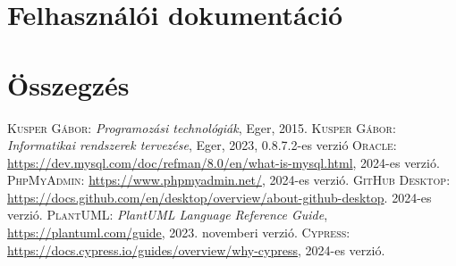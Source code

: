 \documentclass[]{thesis-ekf}
\theoremstyle{definition}
\theoremstyle{remark}
\begin{document}
	\chapter{Felhasználói dokumentáció}

	
	\chapter*{Összegzés}
	
	\begin{thebibliography}{2}
		\textsc{Kusper Gábor}: \emph{Programozási technológiák}, Eger, 2015.
		\textsc{Kusper Gábor}: \emph{Informatikai rendszerek tervezése}, Eger, 2023, 0.8.7.2-es verzió
		\textsc{Oracle}: \url{https://dev.mysql.com/doc/refman/8.0/en/what-is-mysql.html}, 2024-es verzió.
		\textsc{PhpMyAdmin}: \url{https://www.phpmyadmin.net/}, 2024-es verzió.
		\textsc{GitHub Desktop}: \url{https://docs.github.com/en/desktop/overview/about-github-desktop}. 2024-es verzió.
		\textsc{PlantUML}: \emph{PlantUML Language Reference Guide}, \url{https://plantuml.com/guide}, 2023. novemberi verzió.
		\textsc{Cypress}: \url{https://docs.cypress.io/guides/overview/why-cypress}, 2024-es verzió.
	\end{thebibliography}
	
\end{document}
